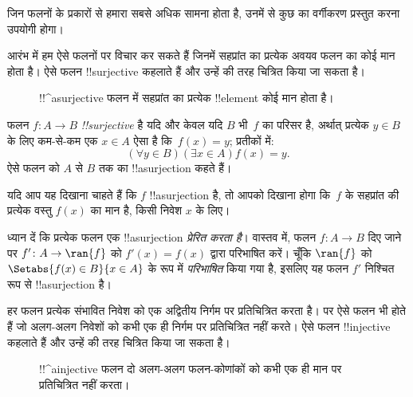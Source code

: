 \documentclass[../../../include/open-logic-section]{subfiles}
\begin{document}

\begin{explain}
जिन फलनों के प्रकारों से हमारा सबसे अधिक सामना होता है, उनमें से कुछ का
वर्गीकरण प्रस्तुत करना उपयोगी होगा।

आरंभ में हम ऐसे फलनों पर विचार कर सकते हैं जिनमें सहप्रांत का प्रत्येक अवयव
फलन का कोई मान होता है। ऐसे फलन !!{surjective} कहलाते हैं और उन्हें
 की तरह चित्रित किया जा सकता है।

\begin{figure}[H]
  \caption{!!^a{surjective} फलन में सहप्रांत का प्रत्येक !!{element} कोई
    मान होता है।}
\end{figure}
\end{explain}

\begin{defn}
फलन $f \colon A \rightarrow B$ \emph{!!{surjective}} है यदि और केवल यदि $B$
भी~$f$ का परिसर है, अर्थात् प्रत्येक $y \in B$ के लिए कम-से-कम एक
$x \in A$ ऐसा है कि~$f(x) = y$; प्रतीकों में:
\[
  (\forall y \in B)(\exists x \in A)f(x) = y.
\]
ऐसे फलन को $A$ से $B$ तक का !!a{surjection} कहते हैं।
\end{defn}

\begin{explain}
यदि आप यह दिखाना चाहते हैं कि $f$ !!a{surjection} है, तो आपको दिखाना होगा
कि~$f$ के सहप्रांत की प्रत्येक वस्तु $f(x)$ का मान है, किसी निवेश $x$ के लिए।

ध्यान दें कि प्रत्येक फलन एक !!a{surjection} \emph{प्रेरित करता है}। वास्तव
में, फलन $f \colon A \to B$ दिए जाने पर $f' \colon A \to \ran{f}$ को
$f'(x) = f(x)$ द्वारा परिभाषित करें। चूँकि $\ran{f}$ को
$\Setabs{f(x) \in B}{x \in A}$ के रूप में \emph{परिभाषित} किया गया है,
इसलिए यह फलन $f'$ निश्चित रूप से !!a{surjection} है।
\end{explain}

\begin{explain}
हर फलन प्रत्येक संभावित निवेश को एक अद्वितीय निर्गम पर प्रतिचित्रित करता है।
पर ऐसे फलन भी होते हैं जो अलग-अलग निवेशों को कभी एक ही निर्गम पर प्रतिचित्रित
नहीं करते। ऐसे फलन !!{injective} कहलाते हैं और उन्हें
 की तरह चित्रित किया जा सकता है।
\begin{figure}[H]
  \caption{!!^a{injective} फलन दो अलग-अलग फलन-कोणांकों को कभी एक ही मान पर
    प्रतिचित्रित नहीं करता।}
\end{figure}
\end{explain}
\end{document}
